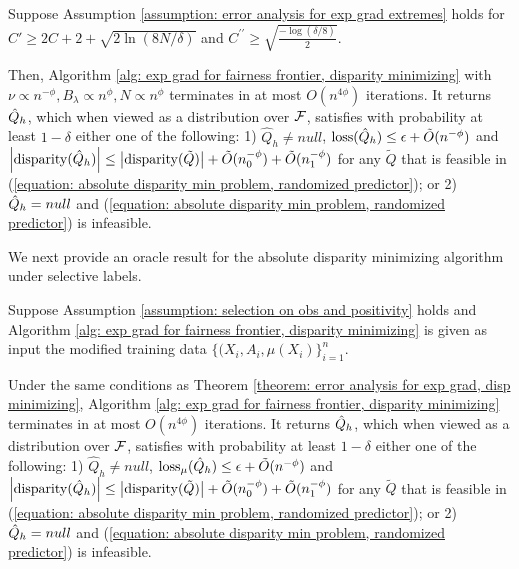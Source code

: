 \documentclass{article}
\begin{document}
\begin{theorem}\label{theorem: error analysis for exp grad, disp minimizing}
Suppose Assumption \ref{assumption: error analysis for exp grad extremes} holds for $C' \geq 2C + 2 + \sqrt{2 \ln(8 N/\delta)}$ and $C^{\prime \prime} \geq \sqrt{\frac{-\log(\delta / 8)}{2}}$.

Then, Algorithm \ref{alg: exp grad for fairness frontier, disparity minimizing} with $\nu \propto n^{-\phi}, B_\lambda \propto n^\phi, N \propto n^\phi$ terminates in at most $O(n^{4\phi})$ iterations. It returns $\hat{Q}_h$, which when viewed as a distribution over $\mathcal{F}$, satisfies with probability at least $1 - \delta$ either one of the following: 1) $\hat{Q}_h \neq null$, $\operatorname{loss}(\hat{Q}_h) \leq \epsilon + \tilde{O}(n^{-\phi})$ and $\left| \operatorname{disparity}(\hat{Q}_h) \right| \leq \left| \operatorname{disparity}(\tilde Q) \right| + \tilde{O}(n_0^{-\phi}) + \tilde{O}(n_1^{-\phi})$ for any $\tilde Q$ that is feasible in (\ref{equation: absolute disparity min problem, randomized predictor}); or 2) $\hat{Q}_h = null$ and (\ref{equation: absolute disparity min problem, randomized predictor}) is infeasible.
\end{theorem}

We next provide an oracle result for the absolute disparity minimizing algorithm under selective labels.

\begin{theorem}\label{theorem: selective labels error analysis for exp grad, disp minimizing}
Suppose Assumption \ref{assumption: selection on obs and positivity} holds and Algorithm \ref{alg: exp grad for fairness frontier, disparity minimizing} is given as input the modified training data $\{(X_i, A_i, \mu(X_i)\}_{i=1}^{n}$.

Under the same conditions as Theorem \ref{theorem: error analysis for exp grad, disp minimizing}, Algorithm \ref{alg: exp grad for fairness frontier, disparity minimizing} terminates in at most $O(n^{4\phi})$ iterations. It returns $\hat{Q}_h$, which when viewed as a distribution over $\mathcal{F}$, satisfies with probability at least $1 - \delta$ either one of the following: 1) $\hat{Q}_h \neq null$, $\operatorname{loss}_\mu(\hat{Q}_h) \leq \epsilon + \tilde{O}(n^{-\phi})$ and $\left| \operatorname{disparity}(\hat{Q}_h) \right| \leq \left| \operatorname{disparity}(\tilde Q) \right| + \tilde{O}(n_0^{-\phi}) + \tilde{O}(n_1^{-\phi})$ for any $\tilde Q$ that is feasible in (\ref{equation: absolute disparity min problem, randomized predictor}); or 2) $\hat{Q}_h = null$ and (\ref{equation: absolute disparity min problem, randomized predictor}) is infeasible.
\end{theorem}
\end{document}
